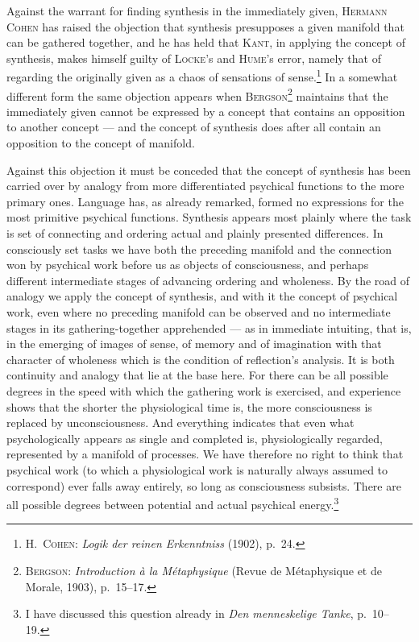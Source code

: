 \documentclass[12pt]{book}
\newcommand{\opage}[1]{\marginnote{\footnotesize\textit{[#1]}}}
\begin{document}
Against the warrant for finding synthesis in the immediately given,
\textsc{Hermann Cohen} has raised the objection that synthesis presupposes a
given manifold that can be gathered together, and he has held that \textsc{Kant},
in applying the concept of synthesis, makes himself guilty of \textsc{Locke}'s
and \textsc{Hume}'s error, namely that of regarding the originally given as a
chaos of sensations of sense.\footnote{\textsc{H.\ Cohen}: \textit{Logik der
reinen Erkenntniss} (1902), p.\ 24.} In a somewhat different form the same
objection appears when \textsc{Bergson}\footnote{\textsc{Bergson}:
\textit{Introduction à la Métaphysique} (Revue de Métaphysique et de Morale,
1903), p.\ 15--17.} maintains that the immediately given cannot be expressed by a
concept that contains an opposition to another concept --- and the concept of
synthesis does after all contain an opposition to the concept of manifold.

Against this objection it must be conceded that the concept of synthesis has
been carried over by analogy from more differentiated psychical functions to the
more primary ones. Language has, as already remarked, formed no expressions for
the most primitive psychical functions. Synthesis appears most plainly where the
task is set of connecting and ordering actual and plainly presented differences.
In consciously set tasks we have both the preceding manifold and the connection
won by psychical work before us as objects of consciousness, and perhaps
different intermediate stages of advancing ordering and wholeness. By the road of
analogy we apply the concept of synthesis, and with it the concept of psychical
work, even where no preceding manifold can be observed and no intermediate stages
in its gathering-together apprehended --- as in immediate intuiting, that is, in
the emerging of images of sense, of memory and of imagination with that character
of wholeness which is the condition of reflection's analysis. It is both
continuity and analogy that lie at the base here. For there can be all possible
degrees in the speed with which the gathering work is exercised, and experience
shows that the shorter the physiological time is, the more consciousness is
replaced by unconsciousness. And \opage{29}everything indicates that even what
psychologically appears as single and completed is, physiologically regarded,
represented by a manifold of processes. We have therefore no right to think that
psychical work (to which a physiological work is naturally always assumed to
correspond) ever falls away entirely, so long as consciousness subsists. There
are all possible degrees between potential and actual psychical
energy.\footnote{I have discussed this question already in \textit{Den
menneskelige Tanke}, p.\ 10--19.}
\end{document}
